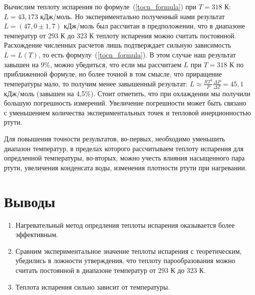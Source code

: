 \documentclass[a4paper,12pt]{article} %
\begin{document}
	Вычислим теплоту испарения по формуле~(\ref{tocn_formula}) при $T = 318$ К: $L = 43,173$ кДж/моль. Но экспериментально полученный нами результат $L = (47,0 \pm 1,7)$ кДж/моль был рассчитан в предположении, что в диапазоне температур от 293 К до 323 К теплоту испарения можно считать постоянной. Расхождение численных расчетов лишь подтверждает сильную зависимость $L = L(T)$, то есть формулу~(\ref{tocn_formula}). В этом случае наш результат завышен на 9\%, можно убедиться, что если мы рассчитаем $L$ при $T = 318$ К по приближенной формуле, но более точной в том смысле, что приращение температуры мало, то получим менее завышенный результат: $L \approx \frac{RT^2}{P} \frac{\Delta P}{\Delta T} = 45,1$ кДж/моль (завышен на 4,5\%). Стоит отметить, что при охлаждении мы получили большую погрешность измерений. Увеличение погрешности может быть связано с уменьшением количества экспериментальных точек и тепловой инерционностью ртути.
	
	Для повышения точности результатов, во-первых, необходимо уменьшить диапазон температур, в пределах которого рассчитываем теплоту испарения для опредленной температуры, во-вторых, можно учесть влияния насыщенного пара ртути, увеличения конденсата воды, изменения плотности ртути при нагревании.
	
\section{Выводы}
\begin{enumerate}
\item
	Нагревательный метод опредления теплоты испарения оказывается более эффективным.
\item
	Сравним экспериментальное значение теплоты испарения с теоретическим, убедились в ложности утверждения, что теплоту парообразования можно считать постоянной в диапазоне температур от 293 К до 323 К. 
\item
	Теплота испарения сильно зависит от температуры.

\end{enumerate}
\end{document}
